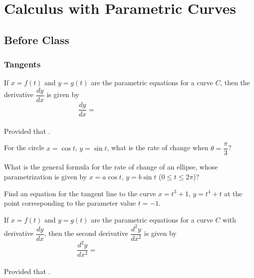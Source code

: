 \documentclass[notes]{subfiles}
\begin{document}
	\fancyhead[LO,RE]{\bfseries \small \currentname}
	\fancyfoot[C]{{}}
	\fancyfoot[RO,LE]{\large \thepage}	%
	
\section*{Calculus with Parametric Curves}\label{cs102}
	\subsection*{Before Class}
	\subsubsection*{Tangents}
		\begin{rmk}
			If $x = f(t)$ and $y = g(t)$ are the parametric equations for a curve $C$, then the derivative $\dfrac{dy}{dx}$ is given by 
				\[\dfrac{dy}{dx} = \hspace{2in}\]
				\\[20pt]
			Provided that .
		\end{rmk}
		\begin{pf}
		
		\end{pf}
			\vspace{1.5in}
			
		\begin{ex}
			For the circle $x = \cos t$, $y = \sin t$, what is the rate of change when $\theta = \dfrac{\pi}{3}$?
		\end{ex}
			
		\begin{ex}
			What is the general formula for the rate of change of an ellipse, whose parametrization is given by $x = a\cos t$, $y = b\sin t$ ($0\leq t\leq 2\pi$)?
		\end{ex}
			\newpage
		
		\begin{ex}
			Find an equation for the tangent line to the curve $x = t^3 + 1$, $y = t^4 + t$ at the point corresponding to the parameter value $t = -1$.  
		\end{ex}	
			
		\begin{rmk}
			If $x = f(t)$ and $y = g(t)$ are the parametric equations for a curve $C$ with derivative $\dfrac{dy}{dx}$, then the second derivative $\dfrac{d^2y}{dx^2}$ is given by 
				\[\dfrac{d^2y}{dx^2} = \hspace{2in}\]
				\\[20pt]
			Provided that .
		\end{rmk}
		\begin{pf}
		
		\end{pf}
			\vspace{1.5in}
			
\end{document}

